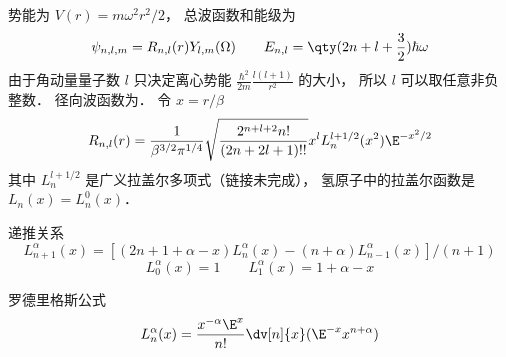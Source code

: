 
\begin{issues}
\issueDraft
\end{issues}


势能为 $V(r) = m\omega^2 r^2/2$，  总波函数和能级为
\begin{equation}
\psi_{n,l,m} = R_{n,l}(r) Y_{l,m}(\Omega)
\qquad
E_{n,l} = \qty(2n + l + \frac32) \hbar \omega
\end{equation}    
由于角动量量子数 $l$ 只决定离心势能 $\frac{\hbar^2}{2m} \frac{l(l + 1)}{r^2}$  的大小， 所以 $l$ 可以取任意非负整数． 径向波函数为． 令 $x = r/\beta $
\begin{equation}
R_{n,l}(r) = \frac{1}{\beta^{3/2} \pi^{1/4}} \sqrt{\frac{2^{n+l+2} n!}{(2n + 2l + 1)!!}} x^l L_n^{l+1/2}(x^2) \E^{-x^2/2}
\end{equation}
其中 $L_n^{l+1/2}$ 是广义拉盖尔多项式（链接未完成）， 氢原子中的拉盖尔函数是 $L_n(x) = L_n^0(x)$． 

递推关系
\begin{equation}
L_{n+1}^\alpha (x) = [(2n + 1 + \alpha  - x)L_n^\alpha (x) - (n + \alpha )L_{n - 1}^\alpha (x)]/(n + 1)
\end{equation}
\begin{equation}
L_0^\alpha (x) = 1
\qquad
L_1^\alpha (x) = 1 + \alpha  - x
\end{equation}
    
罗德里格斯公式
\begin{equation}
L_n^\alpha (x) = \frac{x^{-\alpha} \E^x}{n!} \dv[n]{x} (\E^{-x} x^{n+\alpha})
\end{equation}

